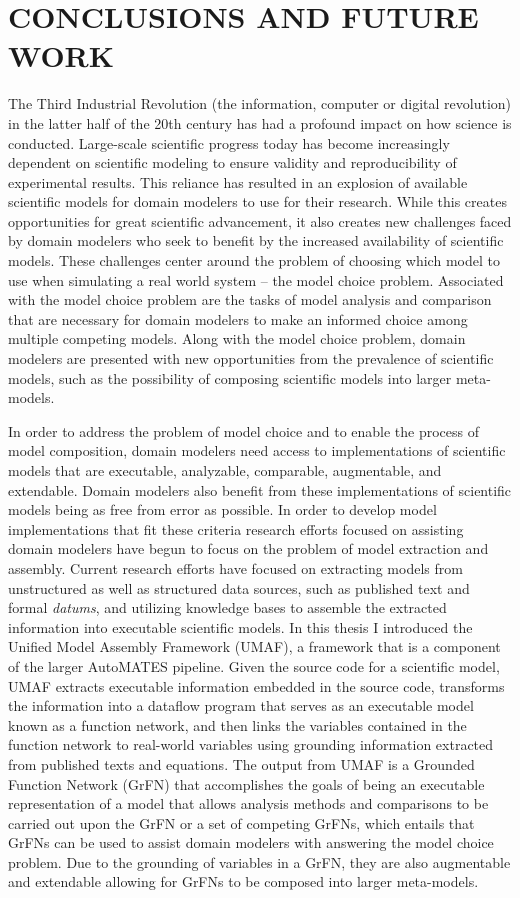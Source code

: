 \chapter{CONCLUSIONS AND FUTURE WORK\label{chapter:conc_and_future}}
The Third Industrial Revolution (the information, computer or digital revolution) in the latter half of the 20th century has had a profound impact on how science is conducted.
Large-scale scientific progress today has become increasingly dependent on scientific modeling to ensure validity and reproducibility of experimental results.
This reliance has resulted in an explosion of available scientific models for domain modelers to use for their research.
While this creates opportunities for great scientific advancement, it also creates new challenges faced by domain modelers who seek to benefit by the increased availability of scientific models.
These challenges center around the problem of choosing which model to use when simulating a real world system -- the model choice problem.
Associated with the model choice problem are the tasks of model analysis and comparison that are necessary for domain modelers to make an informed choice among multiple competing models.
Along with the model choice problem, domain modelers are presented with new opportunities from the prevalence of scientific models, such as the possibility of composing scientific models into larger meta-models.

In order to address the problem of model choice and to enable the process of model composition, domain modelers need access to implementations of scientific models that are executable, analyzable, comparable, augmentable, and extendable.
Domain modelers also benefit from these implementations of scientific models being as free from error as possible.
In order to develop model implementations that fit these criteria research efforts focused on assisting domain modelers have begun to focus on the problem of model extraction and assembly.
Current research efforts have focused on extracting models from unstructured as well as structured data sources, such as published text and formal \textit{datums}, and utilizing knowledge bases to assemble the extracted information into executable scientific models.
In this thesis I introduced the Unified Model Assembly Framework (UMAF), a framework that is a component of the larger AutoMATES pipeline.
Given the source code for a scientific model, UMAF extracts executable information embedded in the source code, transforms the information into a dataflow program that serves as an executable model known as a function network, and then links the variables contained in the function network to real-world variables using grounding information extracted from published texts and equations.
The output from UMAF is a Grounded Function Network (GrFN) that accomplishes the goals of being an executable representation of a model that allows analysis methods and comparisons to be carried out upon the GrFN or a set of competing GrFNs, which entails that GrFNs can be used to assist domain modelers with answering the model choice problem.
Due to the grounding of variables in a GrFN, they are also augmentable and extendable allowing for GrFNs to be composed into larger meta-models.


